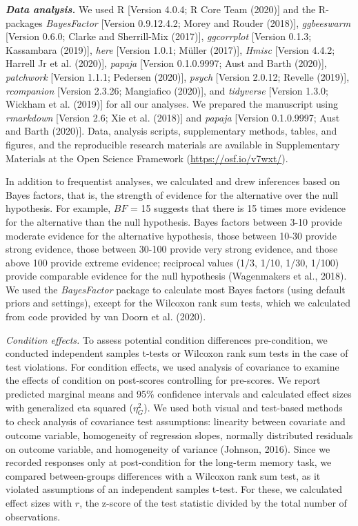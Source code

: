 \documentclass[
  english,
  pub,floatsintext]{apa6}
\begin{document}
\textbf{\emph{Data analysis.}}
We used R {[}Version 4.0.4; R Core Team (2020){]} and the R-packages \emph{BayesFactor} {[}Version 0.9.12.4.2; Morey and Rouder (2018){]}, \emph{ggbeeswarm} {[}Version 0.6.0; Clarke and Sherrill-Mix (2017){]}, \emph{ggcorrplot} {[}Version 0.1.3; Kassambara (2019){]}, \emph{here} {[}Version 1.0.1; Müller (2017){]}, \emph{Hmisc} {[}Version 4.4.2; Harrell Jr et al. (2020){]}, \emph{papaja} {[}Version 0.1.0.9997; Aust and Barth (2020){]}, \emph{patchwork} {[}Version 1.1.1; Pedersen (2020){]}, \emph{psych} {[}Version 2.0.12; Revelle (2019){]}, \emph{rcompanion} {[}Version 2.3.26; Mangiafico (2020){]}, and \emph{tidyverse} {[}Version 1.3.0; Wickham et al. (2019){]} for all our analyses. We prepared the manuscript using \emph{rmarkdown} {[}Version 2.6; Xie et al. (2018){]} and \emph{papaja} {[}Version 0.1.0.9997; Aust and Barth (2020){]}. Data, analysis scripts, supplementary methods, tables, and figures, and the reproducible research materials are available in Supplementary Materials at the Open Science Framework (\url{https://osf.io/v7wxt/}).

In addition to frequentist analyses, we calculated and drew inferences based on Bayes factors, that is, the strength of evidence for the alternative over the null hypothesis. For example, \(BF\) = 15 suggests that there is 15 times more evidence for the alternative than the null hypothesis. Bayes factors between 3-10 provide moderate evidence for the alternative hypothesis, those between 10-30 provide strong evidence, those between 30-100 provide very strong evidence, and those above 100 provide extreme evidence; reciprocal values (1/3, 1/10, 1/30, 1/100) provide comparable evidence for the null hypothesis (Wagenmakers et al., 2018). We used the \emph{BayesFactor} package to calculate most Bayes factors (using default priors and settings), except for the Wilcoxon rank sum tests, which we calculated from code provided by van Doorn et al. (2020).

\emph{Condition effects.}
To assess potential condition differences pre-condition, we conducted independent samples t-tests or Wilcoxon rank sum tests in the case of test violations. For condition effects, we used analysis of covariance to examine the effects of condition on post-scores controlling for pre-scores. We report predicted marginal means and 95\% confidence intervals and calculated effect sizes with generalized eta squared (\({\eta}^2_G\)). We used both visual and test-based methods to check analysis of covariance test assumptions: linearity between covariate and outcome variable, homogeneity of regression slopes, normally distributed residuals on outcome variable, and homogeneity of variance (Johnson, 2016). Since we recorded responses only at post-condition for the long-term memory task, we compared between-groups differences with a Wilcoxon rank sum test, as it violated assumptions of an independent samples t-test. For these, we calculated effect sizes with \(r\), the z-score of the test statistic divided by the total number of observations.
\end{document}
